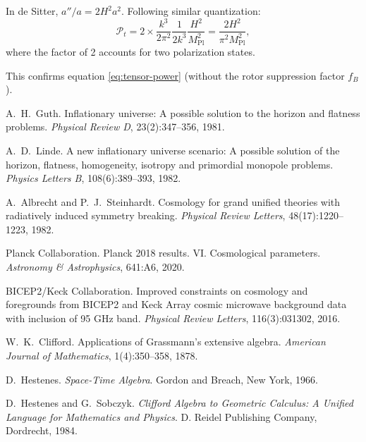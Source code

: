 \documentclass[11pt,a4paper]{article}
\numberwithin{equation}{section}
\theoremstyle{plain}
\theoremstyle{definition}
\theoremstyle{remark}
\begin{document}
In de Sitter, $a''/a = 2H^2a^2$. Following similar quantization:
\begin{equation}
\mathcal{P}_t = 2\times\frac{k^3}{2\pi^2}\frac{1}{2k^3}\frac{H^2}{M_{\mathrm{Pl}}^2} = \frac{2H^2}{\pi^2 M_{\mathrm{Pl}}^2},
\end{equation}
where the factor of 2 accounts for two polarization states.

This confirms equation \eqref{eq:tensor-power} (without the rotor suppression factor $f_B$).


\begin{thebibliography}{99}

A.~H.~Guth.
\newblock Inflationary universe: A possible solution to the horizon and flatness problems.
\newblock \emph{Physical Review D}, 23(2):347--356, 1981.

A.~D.~Linde.
\newblock A new inflationary universe scenario: A possible solution of the horizon, flatness, homogeneity, isotropy and primordial monopole problems.
\newblock \emph{Physics Letters B}, 108(6):389--393, 1982.

A.~Albrecht and P.~J.~Steinhardt.
\newblock Cosmology for grand unified theories with radiatively induced symmetry breaking.
\newblock \emph{Physical Review Letters}, 48(17):1220--1223, 1982.

Planck Collaboration.
\newblock Planck 2018 results. VI. Cosmological parameters.
\newblock \emph{Astronomy \& Astrophysics}, 641:A6, 2020.

BICEP2/Keck Collaboration.
\newblock Improved constraints on cosmology and foregrounds from BICEP2 and Keck Array cosmic microwave background data with inclusion of 95 GHz band.
\newblock \emph{Physical Review Letters}, 116(3):031302, 2016.

W.~K.~Clifford.
\newblock Applications of Grassmann's extensive algebra.
\newblock \emph{American Journal of Mathematics}, 1(4):350--358, 1878.

D.~Hestenes.
\newblock \emph{Space-Time Algebra}.
\newblock Gordon and Breach, New York, 1966.

D.~Hestenes and G.~Sobczyk.
\newblock \emph{Clifford Algebra to Geometric Calculus: A Unified Language for Mathematics and Physics}.
\newblock D. Reidel Publishing Company, Dordrecht, 1984.


\end{thebibliography}
\end{document}
